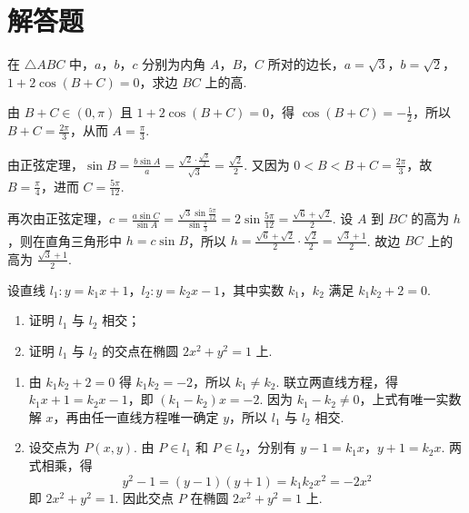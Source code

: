 \section{解答题}

\begin{problem}
在 \(\triangle ABC\) 中，\(a\)，\(b\)，\(c\) 分别为内角 \(A\)，\(B\)，\(C\) 所对的边长，\(a = \sqrt{3}\)，\(b = \sqrt{2}\)，\(1 + 2\cos(B + C) = 0\)，求边 \(BC\) 上的高.
\end{problem}

\begin{solution}
由 \(B+C\in(0,\pi)\) 且 \(1+2\cos(B+C)=0\)，得 \(\cos(B+C)=-\frac12\)，所以 \(B+C=\frac{2\pi}{3}\)，从而 \(A=\frac\pi3\).

由正弦定理，\(\sin B=\frac{b\sin A}{a}=\frac{\sqrt2\cdot\frac{\sqrt3}{2}}{\sqrt3}=\frac{\sqrt2}{2}\).
又因为 \(0<B<B+C=\frac{2\pi}{3}\)，故 \(B=\frac\pi4\)，进而 \(C=\frac{5\pi}{12}\).

再次由正弦定理，\(c=\frac{a\sin C}{\sin A}=\frac{\sqrt3\sin\frac{5\pi}{12}}{\sin\frac\pi3}=2\sin\frac{5\pi}{12}=\frac{\sqrt6+\sqrt2}{2}\). 设 \(A\) 到 \(BC\) 的高为 \(h\)，则在直角三角形中 \(h=c\sin B\)，所以 \(h=\frac{\sqrt6+\sqrt2}{2}\cdot\frac{\sqrt2}{2}=\frac{\sqrt3+1}{2}\).
故边 \(BC\) 上的高为 \(\frac{\sqrt3+1}{2}\).
\end{solution}

\begin{problem}
设直线 \(l_{1} : y = k_{1}x + 1\)，\(l_{2} : y = k_{2}x - 1\)，其中实数 \(k_{1}\)，\(k_{2}\) 满足 \(k_{1}k_{2} + 2 = 0\).
\begin{enumerate}
\item 证明 \(l_{1}\) 与 \(l_{2}\) 相交；
\item 证明 \(l_{1}\) 与 \(l_{2}\) 的交点在椭圆 \(2x^{2} + y^{2} = 1\) 上.
\end{enumerate}
\end{problem}

\begin{solution}
\begin{enumerate}
\item 由 \(k_{1}k_{2}+2=0\) 得 \(k_{1}k_{2}=-2\)，所以 \(k_{1}\ne k_{2}\). 联立两直线方程，得 \(k_{1}x+1=k_{2}x-1\)，即 \((k_{1}-k_{2})x=-2\).
因为 \(k_{1}-k_{2}\ne0\)，上式有唯一实数解 \(x\)，再由任一直线方程唯一确定 \(y\)，所以 \(l_{1}\) 与 \(l_{2}\) 相交.

\item 设交点为 \(P(x,y)\). 由 \(P\in l_{1}\) 和 \(P\in l_{2}\)，分别有 \(y-1=k_{1}x\)，\(y+1=k_{2}x\).
两式相乘，得
\[
y^{2}-1=(y-1)(y+1)=k_{1}k_{2}x^{2}=-2x^{2}
\]
即 \(2x^{2}+y^{2}=1\). 因此交点 \(P\) 在椭圆 \(2x^{2}+y^{2}=1\) 上.
\end{enumerate}
\end{solution}

